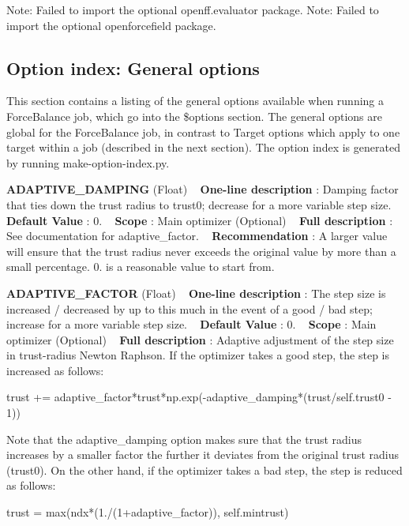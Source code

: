 Note\+: Failed to import the optional openff.\+evaluator package. Note\+: Failed to import the optional openforcefield package. \hypertarget{glossary_gen_option_index}{}\subsection{Option index\+: General options}\label{glossary_gen_option_index}
This section contains a listing of the general options available when running a Force\+Balance job, which go into the \$options section. The general options are global for the Force\+Balance job, in contrast to \textquotesingle{}Target options\textquotesingle{} which apply to one target within a job (described in the next section). The option index is generated by running make-\/option-\/index.\+py.

\begin{DoxyItemize}
\item {\bfseries  A\+D\+A\+P\+T\+I\+V\+E\+\_\+\+D\+A\+M\+P\+I\+NG } (Float) ~\newline
{\bfseries  One-\/line description }\+: Damping factor that ties down the trust radius to trust0; decrease for a more variable step size. ~\newline
{\bfseries  Default Value }\+: 0. ~\newline
{\bfseries  Scope }\+: Main optimizer (Optional) ~\newline
{\bfseries  Full description }\+: See documentation for adaptive\+\_\+factor. ~\newline
{\bfseries  Recommendation }\+: A larger value will ensure that the trust radius never exceeds the original value by more than a small percentage. 0. is a reasonable value to start from.\end{DoxyItemize}
\begin{DoxyItemize}
\item {\bfseries  A\+D\+A\+P\+T\+I\+V\+E\+\_\+\+F\+A\+C\+T\+OR } (Float) ~\newline
{\bfseries  One-\/line description }\+: The step size is increased / decreased by up to this much in the event of a good / bad step; increase for a more variable step size. ~\newline
{\bfseries  Default Value }\+: 0. ~\newline
{\bfseries  Scope }\+: Main optimizer (Optional) ~\newline
{\bfseries  Full description }\+: Adaptive adjustment of the step size in trust-\/radius Newton Raphson. If the optimizer takes a good step, the step is increased as follows\+: \begin{DoxyVerb} trust += adaptive_factor*trust*np.exp(-adaptive_damping*(trust/self.trust0 - 1))\end{DoxyVerb}
 Note that the adaptive\+\_\+damping option makes sure that the trust radius increases by a smaller factor the further it deviates from the original trust radius (trust0). On the other hand, if the optimizer takes a bad step, the step is reduced as follows\+: \begin{DoxyVerb} trust = max(ndx*(1./(1+adaptive_factor)), self.mintrust)\end{DoxyVerb}
\end{DoxyItemize}
